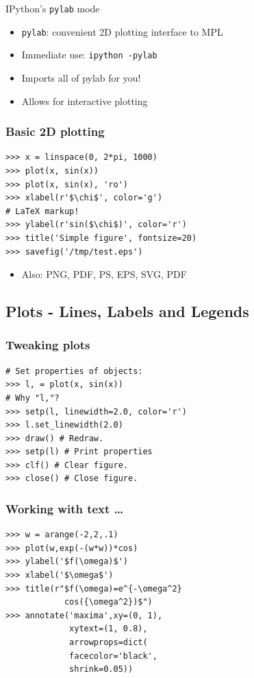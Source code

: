 \documentclass[14pt,compress]{beamer}
\newcounter{time}
\newcommand{\inctime}[1]{\addtocounter{time}{#1}{\tiny \thetime\ m}}
\newcommand{\typ}[1]{\texttt{#1}}
\begin{document}
\begin{frame}
    {IPython's \typ{pylab} mode}
\begin{itemize}
    \item \typ{pylab}: convenient 2D plotting interface to MPL
    \item Immediate use: \typ{ipython -pylab}
    \item Imports all of pylab for you!
    \item Allows for interactive plotting
\end{itemize}
\end{frame}

\begin{frame}[fragile]
    \frametitle{Basic 2D plotting}

\begin{lstlisting}
>>> x = linspace(0, 2*pi, 1000)
>>> plot(x, sin(x)) 
>>> plot(x, sin(x), 'ro')
>>> xlabel(r'$\chi$', color='g')
# LaTeX markup!
>>> ylabel(r'sin($\chi$)', color='r')
>>> title('Simple figure', fontsize=20)
>>> savefig('/tmp/test.eps')
\end{lstlisting}
\begin{itemize}
  \item Also: PNG, PDF, PS, EPS, SVG, PDF
\end{itemize}
\inctime{5}
\end{frame}
       
\subsection{Plots - Lines, Labels and Legends}
\begin{frame}[fragile]
  \frametitle{Tweaking plots}
\begin{lstlisting}
# Set properties of objects:
>>> l, = plot(x, sin(x))
# Why "l,"?
>>> setp(l, linewidth=2.0, color='r')
>>> l.set_linewidth(2.0)
>>> draw() # Redraw.
>>> setp(l) # Print properties
>>> clf() # Clear figure.
>>> close() # Close figure.
\end{lstlisting}
\end{frame}

\begin{frame}[fragile]
   \frametitle{Working with text \ldots}
\begin{lstlisting}
>>> w = arange(-2,2,.1)
>>> plot(w,exp(-(w*w))*cos)
>>> ylabel('$f(\omega)$')
>>> xlabel('$\omega$')
>>> title(r"$f(\omega)=e^{-\omega^2}
            cos({\omega^2})$")
>>> annotate('maxima',xy=(0, 1), 
             xytext=(1, 0.8), 
             arrowprops=dict(
             facecolor='black', 
             shrink=0.05))
\end{lstlisting}
    
\end{frame}
\end{document}
